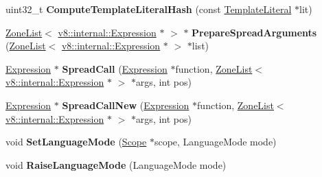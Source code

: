 \begin{DoxyCompactItemize}
\item 
uint32\+\_\+t {\bfseries Compute\+Template\+Literal\+Hash} (const \hyperlink{classv8_1_1internal_1_1_parser_traits_1_1_template_literal}{Template\+Literal} $\ast$lit)\hypertarget{classv8_1_1internal_1_1_parser_aebf93b6817e1993b24be35c04a3313c3}{}\label{classv8_1_1internal_1_1_parser_aebf93b6817e1993b24be35c04a3313c3}

\item 
\hyperlink{classv8_1_1internal_1_1_zone_list}{Zone\+List}$<$ \hyperlink{classv8_1_1internal_1_1_expression}{v8\+::internal\+::\+Expression} $\ast$ $>$ $\ast$ {\bfseries Prepare\+Spread\+Arguments} (\hyperlink{classv8_1_1internal_1_1_zone_list}{Zone\+List}$<$ \hyperlink{classv8_1_1internal_1_1_expression}{v8\+::internal\+::\+Expression} $\ast$ $>$ $\ast$list)\hypertarget{classv8_1_1internal_1_1_parser_a7f6e26f89e8d15c6fc8e87f91deb7936}{}\label{classv8_1_1internal_1_1_parser_a7f6e26f89e8d15c6fc8e87f91deb7936}

\item 
\hyperlink{classv8_1_1internal_1_1_expression}{Expression} $\ast$ {\bfseries Spread\+Call} (\hyperlink{classv8_1_1internal_1_1_expression}{Expression} $\ast$function, \hyperlink{classv8_1_1internal_1_1_zone_list}{Zone\+List}$<$ \hyperlink{classv8_1_1internal_1_1_expression}{v8\+::internal\+::\+Expression} $\ast$ $>$ $\ast$args, int pos)\hypertarget{classv8_1_1internal_1_1_parser_a0465b537546bce87db829b39a5fadadd}{}\label{classv8_1_1internal_1_1_parser_a0465b537546bce87db829b39a5fadadd}

\item 
\hyperlink{classv8_1_1internal_1_1_expression}{Expression} $\ast$ {\bfseries Spread\+Call\+New} (\hyperlink{classv8_1_1internal_1_1_expression}{Expression} $\ast$function, \hyperlink{classv8_1_1internal_1_1_zone_list}{Zone\+List}$<$ \hyperlink{classv8_1_1internal_1_1_expression}{v8\+::internal\+::\+Expression} $\ast$ $>$ $\ast$args, int pos)\hypertarget{classv8_1_1internal_1_1_parser_acf92ee8032f5a18166beb1afc9d67d0f}{}\label{classv8_1_1internal_1_1_parser_acf92ee8032f5a18166beb1afc9d67d0f}

\item 
void {\bfseries Set\+Language\+Mode} (\hyperlink{classv8_1_1internal_1_1_scope}{Scope} $\ast$scope, Language\+Mode mode)\hypertarget{classv8_1_1internal_1_1_parser_a010d6e546a1eb866a25ef48eaf59da0a}{}\label{classv8_1_1internal_1_1_parser_a010d6e546a1eb866a25ef48eaf59da0a}

\item 
void {\bfseries Raise\+Language\+Mode} (Language\+Mode mode)\hypertarget{classv8_1_1internal_1_1_parser_a345a177d015e420423df6c845032fb66}{}\label{classv8_1_1internal_1_1_parser_a345a177d015e420423df6c845032fb66}


\end{DoxyCompactItemize}
